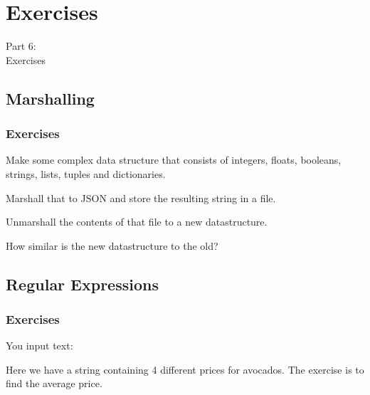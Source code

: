 
{
\renewcommand{\bgcolor}{ex}

\section{Exercises}
\begin{frame}
    \vspace{25mm}
    \begin{center}
        \Huge{Part 6:\\Exercises}
    \end{center}
\end{frame}

\subsection{Marshalling}
\begin{frame}[fragile]
    \frametitle{Exercises }
    \vspace{3mm}
    Make some complex data structure that consists of integers, floats, booleans, strings, lists, tuples and dictionaries.
    
    \vspace{5mm}
    Marshall that to JSON and store the resulting string in a file.
    
    \vspace{5mm}
    Unmarshall the contents of that file to a new datastructure.
    
    \vspace{5mm}
    How similar is the new datastructure to the old?
\end{frame}

\subsection{Regular Expressions}
\begin{frame}[fragile]
    \frametitle{Exercises }
    \vspace{0mm}
    You input text: \textsl{\textcolor{purple}{}}
    
    \vspace{5mm}
    Here we have a string containing 4 different prices for avocados. The exercise is to find the average price.
    

\end{frame}}

